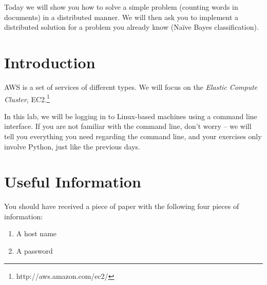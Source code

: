 Today we will show you how to solve a simple problem (counting words in
documents) in a distributed manner. We will then ask you to implement a
distributed solution for a problem you already know (Na\"{i}ve Bayes
classification).

\section{Introduction}

AWS is a set of services of different types. We will focus on the \emph{Elastic
Compute Cluster}, EC2.\footnote{http://aws.amazon.com/ec2/}

In this lab, we will be logging in to Linux-based machines using a command line
interface. If you are not familiar with the command line, don't worry -- we
will tell you everything you need regarding the command line, and your
exercises only involve Python, just like the previous days.

\section{Useful Information}

You should have received a piece of paper with the following four pieces of
information:

\begin{enumerate}
\item A host name
\item A password
\end{enumerate}

%
%
%
%

